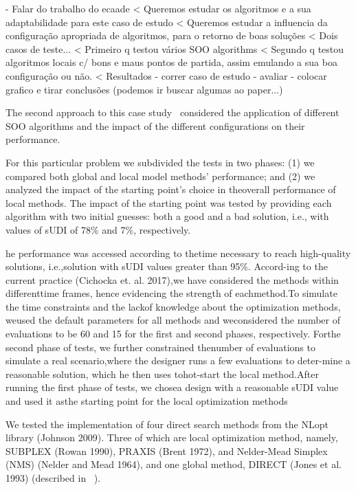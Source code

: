 
- Falar do trabalho do ecaade
< Queremos estudar os algoritmos e a sua adaptabilidade para este caso de estudo
< Queremos estudar a influencia da configuração apropriada de algoritmos, para o retorno de boas soluções
< Dois casos de teste...
< Primeiro q testou vários \ac{SOO} algorithms
< Segundo q testou algoritmos locais c/ bons e maus pontos de partida, assim emulando a sua boa configuração ou não. 
< Resultados
- correr caso de estudo 
- avaliar 
- colocar grafico e tirar conclusões (podemos ir buscar algumas ao paper...)

The second approach to this case study~\cite{Belem2018optimizeddesign} considered the application of different \ac{SOO} algorithms and the impact of the different configurations on their performance.

For this particular problem we subdivided the tests in two phases: (1) we compared both global and local model methods’ performance; and (2) we analyzed the impact of the starting point’s choice in theoverall performance of local methods. The impact of the starting point was tested by providing each algorithm with two initial guesses: both a good and a bad solution, i.e., with values of sUDI of 78\% and 7\%, respectively. 


he performance was accessed according to thetime necessary to reach high-quality solutions, i.e.,solution with sUDI values greater than 95\%. Accord-ing to the current practice (Cichocka et.  al.  2017),we have considered the methods within differenttime frames, hence evidencing the strength of eachmethod.To simulate the time constraints and the lackof knowledge about the optimization methods, weused the default parameters for all methods and weconsidered the number of evaluations to be 60 and 15 for the first and second phases, respectively. Forthe second phase of tests, we further constrained thenumber of evaluations to simulate a real scenario,where the designer runs a few evaluations to deter-mine a reasonable solution, which he then uses tohot-start the local method.After running the first phase of tests, we chosea design with a reasonable sUDI value and used it asthe starting point for the local optimization methods

We tested the implementation of four direct search methods from the NLopt library (Johnson 2009). Three of which are local optimization method, namely, SUBPLEX (Rowan 1990), PRAXIS (Brent 1972), and Nelder-Mead Simplex (NMS) (Nelder and Mead 1964), and one global method, DIRECT (Jones et al. 1993) (described in ~).



